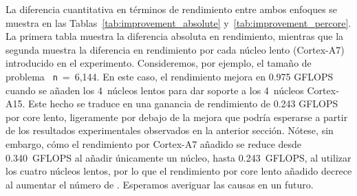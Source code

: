 %
%

La diferencia cuantitativa en términos de rendimiento entre ambos enfoques
se muestra en las Tablas~\ref{tab:improvement_absolute}
y~\ref{tab:improvement_percore}.  La primera tabla muestra la diferencia
absoluta en rendimiento, mientras que la segunda muestra la diferencia en
rendimiento por cada núcleo lento (Cortex-A7) introducido en el
experimento. Consideremos, por ejemplo, el tamaño de problema {\tt
  n}~=~6,144.  En este caso, el rendimiento mejora en 0.975 GFLOPS cuando
se añaden los 4~núcleos lentos para dar soporte a los 4~núcleos
Cortex-A15. Este hecho se traduce en una ganancia de rendimiento de 0.243
GFLOPS por core lento, ligeramente por debajo de la mejora que podría
esperarse a partir de los resultados experimentales observados en la
anterior sección. Nótese, sin embargo, cómo el rendimiento por Cortex-A7
añadido se reduce desde 0.340~GFLOPS al añadir únicamente un núcleo, hasta
0.243~GFLOPS, al utilizar los cuatro núcleos lentos, por lo que el
rendimiento por core lento añadido decrece al aumentar el número de
\wts. Esperamos averiguar las causas en un futuro.

\newcommand{\fg}[1]{\textcolor{ForestGreen}{#1}} %
\newcommand{\br}[1]{\textcolor{BrickRed}{#1}} %

